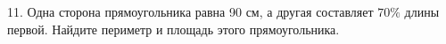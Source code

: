 11. Одна сторона прямоугольника равна 90 см, а другая составляет $70\%$ длины первой. Найдите периметр и площадь этого прямоугольника.\\
